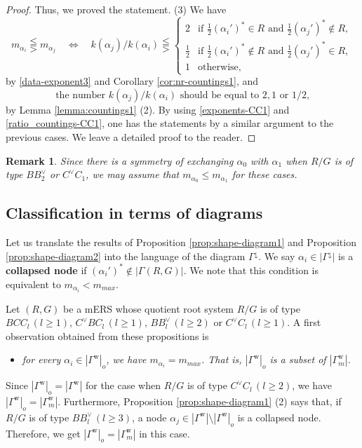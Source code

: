 \documentclass[11pt]{amsart}
\newcommand{\w}{\mathrm{w}}
\newtheorem{rem}[thm]{Remark}%
\begin{document}
{{\begin{proof}
\vskip 1mm
\noindent
Thus, we proved the statement.
\vskip 3mm
\noindent
(3) We have
\begin{equation}\label{exponents-CC1}
m_{\alpha_i}\lesseqqgtr m_{\alpha_j}\quad \Longleftrightarrow\quad
k(\alpha_j)/k(\alpha_i)\lesseqqgtr 
\begin{cases}
2 & \text{if }\tfrac12 (\alpha_i')^\ast \in R \text{ and }
\tfrac12 (\alpha_j')^\ast \not\in R,\\
\frac12 &\text{if }\tfrac12 (\alpha_i')^\ast \not\in R \text{ and }
\tfrac12 (\alpha_j')^\ast \in R,\\
 1 & \text{otherwise},
\end{cases}
\end{equation}
by \eqref{data-exponent3} and Corollary \ref{cor:nr-countings1}, and 
\begin{equation}\label{ratio_countings-CC1}
\text{the number $k(\alpha_j)/k(\alpha_i)$ should be equal to $2,1$ or $1/2$,} 
\end{equation}
by Lemma \ref{lemma:countings1} (2). By using \eqref{exponents-CC1} and 
\eqref{ratio_countings-CC1}, one has the statements by a similar argument to
the previous cases. We leave a detailed proof to the reader.
\end{proof}}

\begin{rem} 
Since there is a symmetry of exchanging $\alpha_0$ with $\alpha_1$ when
$R/G$ is of type $BB^\vee_2$ or $C^\vee C_1$, we may assume that 
$m_{\alpha_0}\leq m_{\alpha_1}$ for these cases.  
\end{rem}
\subsection{Classification in terms of diagrams}\label{sect:list_of_diagrams}
Let us translate the results of Proposition \ref{prop:shape-diagram1} and 
Proposition \ref{prop:shape-diagram2} into the 
language of the diagram $\Gamma^\downarrow$.  
We say $\alpha_i\in |\Gamma^\downarrow|$ is a 
\textbf{collapsed node} if 
$(\alpha_i')^\ast\not\in |\Gamma(R,G)|$. 
We note that this condition is equivalent to $m_{\alpha_i}<m_{max}$. 

Let $(R,G)$ be a mERS whose quotient root system $R/G$ is of type 
$BCC_l \,(l\geq 1),\, C^\vee BC_l\,(l\geq 1),\, BB^\vee_l\,(l\geq 2)$ or 
$C^\vee C_l\,(l\geq 1)$. A first observation obtained
from these propositions is 
\begin{itemize}
\item[(a)] {\it for every $\alpha_i\in |\Gamma^\w|_o$, we have 
$m_{\alpha_i}=m_{max}$. That is, $|\Gamma^\w|_o$ is a subset of 
$|\Gamma^\w_m|$.}
\end{itemize}
Since $|\Gamma^\w|_o=|\Gamma^\w|$ for the case when $R/G$ is of type 
$C^\vee C_l\,(l\geq 2)$, we have $|\Gamma^\w|_o=|\Gamma^\w_m|$. 
Furthermore, Proposition \ref{prop:shape-diagram1} (2) says that, if $R/G$ is of
type $BB^\vee_l\,(l\geq 3)$, a node $\alpha_j\in |\Gamma^\w|\setminus 
|\Gamma^\w|_o$ is a collapsed node. Therefore, we get 
$|\Gamma^\w|_o=|\Gamma^\w_m|$ in this case. 

}
\end{document}
